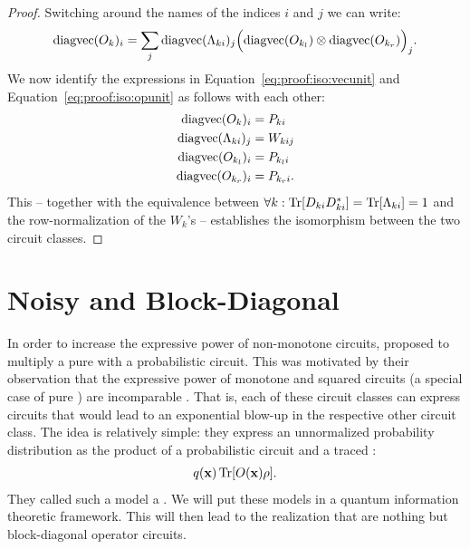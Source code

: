 \begin{proof}
	Switching around the names of the indices $i$ and $j$ we can write:
	\begin{align}
		\text{diagvec} (O_{k} )_i
		=
		\sum_j  \text{diagvec} ( \Lambda_{ki} )_j  \Bigl( \text{diagvec} (O_{k_l}) \otimes \text{diagvec} (O_{k_r}) \Bigr)_j.
		\label{eq:proof:iso:opunit}
	\end{align}
	We now identify the expressions in Equation~\ref{eq:proof:iso:vecunit} and Equation~\ref{eq:proof:iso:opunit} as follows with each other:
	\begin{align}
		\text{diagvec} (O_{k} )_i   & = P_{ki}
		\\
		\text{diagvec} (\Lambda_{ki} )_j    & = W_{kij}
		\\
		\text{diagvec} (O_{k_l} )_i & = P_{k_l i}
		\\
		\text{diagvec} (O_{k_r} )_i & = P_{k_r i}.
	\end{align}
	This -- together with the equivalence between $\forall k: \Tr [D_{ki}D^{*}_{ki}]= \Tr [\Lambda_{ki}] =1$ and the row-normalization of the $W_k$'s -- establishes the isomorphism between the two circuit classes.
\end{proof}







\section{Noisy and Block-Diagonal \puncs}
\label{sec:noisyblockdiagonalpuncs}

In order to increase the expressive power of non-monotone circuits, \citet{loconte2025sum} proposed to multiply a pure \punc with a probabilistic circuit.
This was motivated by their observation that the expressive power of monotone and squared circuits (a special case of pure \puncs) are incomparable \citep{decolnet2021compilation}. That is, each of these circuit classes can express circuits that would lead to an exponential blow-up in the respective other circuit class. The idea is relatively simple: they express an unnormalized probability distribution as the product of a probabilistic circuit and a traced \punc:
\begin{align}
	q(\mathbf{x}) \Tr [O(\mathbf{x}) \rho].
\end{align}
They called such a model a \msocs. We will put these models in a quantum information theoretic framework. This will then lead to the realization that \msocss are nothing but block-diagonal operator circuits.


